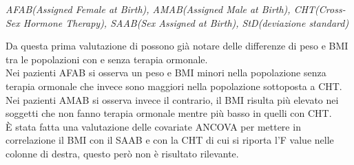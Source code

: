 \documentclass[12pt]{article}
\begin{document}
\begin{table}[H]
\centering
    \caption{Valutazioni sociodemografiche e valori di peso e BMI}
    \vspace*{0.2em}
{\renewcommand{\arraystretch}{2}%
}
    \label{tab:my_label}
    \footnotesize \textit{AFAB(Assigned Female at Birth), AMAB(Assigned Male at Birth), CHT(Cross-Sex Hormone Therapy), SAAB(Sex Assigned at Birth), StD(deviazione standard)}
\end{table}

Da questa prima valutazione di possono già notare delle differenze di peso e BMI tra le popolazioni con e senza terapia ormonale.\\
Nei pazienti AFAB si osserva un peso e BMI minori nella popolazione senza terapia ormonale che invece sono maggiori nella popolazione sottoposta a CHT.\\
Nei pazienti AMAB si osserva invece il contrario, il BMI risulta più elevato nei soggetti che non fanno terapia ormonale mentre più basso in quelli con CHT.\\
È stata fatta una valutazione delle covariate ANCOVA per mettere in correlazione il BMI con il SAAB e con la CHT di cui si riporta l'F value nelle colonne di destra, questo però non è risultato rilevante.
\end{document}
